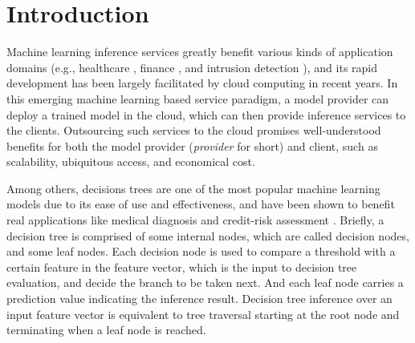 \documentclass[10pt,journal,compsoc]{IEEEtran}
\begin{document}
\maketitle


\IEEEdisplaynontitleabstractindextext

\IEEEpeerreviewmaketitle


\section{Introduction}


Machine learning inference services greatly benefit various kinds of application domains (e.g., healthcare \cite{AzarE13a,libbrecht2015machine,WangZLZL20}, finance \cite{YapOH11,DelenKU13}, and intrusion detection \cite{SindhuGK12,AmorBE04}), and its rapid development has been largely facilitated by cloud computing \cite{AzureML,googleML,awssagemaker} in recent years.
%
%
In this emerging machine learning based service paradigm, a model provider can deploy a trained model in the cloud, which can then provide inference services to the clients.
%
Outsourcing such services to the cloud promises well-understood benefits for both the model provider (\emph{provider} for short) and client, such as scalability, ubiquitous access, and economical cost.
%


Among others, decisions trees are one of the most popular machine learning models due to its ease of use and effectiveness, and have been shown to benefit real applications like medical diagnosis \cite{AzarE13a,LiangQL19} and credit-risk assessment \cite{YapOH11}.
%
%
Briefly, a decision tree is comprised of some internal nodes, which are called decision nodes, and some leaf nodes.
%
Each decision node is used to compare a threshold with a certain feature in the feature vector, which is the input to decision tree evaluation, and decide the branch to be taken next.
%
And each leaf node carries a prediction value indicating the inference result.
%
Decision tree inference over an input feature vector is equivalent to tree traversal starting at the root node and terminating when a leaf node is reached.
\end{document}
